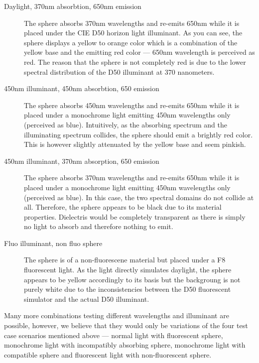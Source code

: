 \begin{description}
	\item[Daylight, 370nm absorbtion, 650nm emission] The sphere absorbs 370nm wavelengths and re-emits 650nm while it is placed under the CIE D50 horizon light illuminant. As you can see, the sphere displays a yellow to orange color which is a combination of the yellow base and the emitting red color --- 650nm wavelength is perceived as red. The reason that the sphere is not completely red is due to the lower spectral distribution of the D50 illuminant at 370 nanometers.
	\item[450nm illuminant, 450nm absorbtion, 650 emission] The sphere absorbs 450nm wavelengths and re-emits 650nm while it is placed under a monochrome light emitting 450nm wavelengths only (perceived as blue). Intuitively, as the absorbing spectrum and the illuminating spectrum collides, the sphere should emit a brightly red color. This is however slightly attenuated by the yellow base and seem pinkish.
	\item[450nm illuminant, 370nm absorption, 650 emission] The sphere absorbs 370nm wavelengths and re-emits 650nm while it is placed under a monochrome light emitting 450nm wavelengths only (perceived as blue). In this case, the two spectral domains do not collide at all. Therefore, the sphere appears to be black due to its material properties. Dielectris would be completely transparent as there is simply no light to absorb and therefore nothing to emit.
	\item[Fluo illuminant, non fluo sphere] The sphere is of a non-fluorescene material but placed under a F8 fluorescent light. As the light directly simulates daylight, the sphere appears to be yellow accordingly to its basis but the backgroung is not purely white due to the inconsistencies between the D50 fluorescent simulator and the actual D50 illuminant.
\end{description}

Many more combinations testing different wavelengths and illuminant are possible, however, we believe that they would only be variations of the four test case scenarios mentioned above --- normal light with fluorescent sphere, monochrome light with incompatibly absorbing sphere, monochrome light with compatible sphere and fluorescent light with non-fluorescent sphere.

